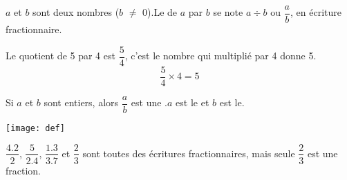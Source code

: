 \begin{mydef}
	$a$ et $b$ sont deux nombres ($b$ $\neq$ 0).\pause Le  de $a$ par $b$ se note $a \div b$ ou $\dfrac{a}{b}$, en écriture fractionnaire.\pause
\end{mydef}

\begin{myex}
		Le quotient de 5 par 4 est $\dfrac{5}{4}$, c'est le nombre qui multiplié par 4 donne 5. \pause
		\begin{equation*}
			\dfrac{5}{4} \times 4 = 5
		\end{equation*}

\end{myex}

\begin{mydef}
	Si $a$ et $b$ sont entiers, alors $\dfrac{a}{b}$ est une .\pause $a$ est le\pause {} et $b$ est le\pause {}.	
	
\end{mydef}

\begin{center}
	\texttt{[image: def]}
\end{center}

\begin{myex}
	$\dfrac{\num{4.2}}{\num{2}}$, $\dfrac{\num{5}}{\num{2.4}}$, $\dfrac{\num{1.3}}{\num{3.7}}$ et $\dfrac{\num{2}}{\num{3}}$ sont toutes des écritures fractionnaires, mais seule $\dfrac{\num{2}}{\num{3}}$ est une fraction.
\end{myex}